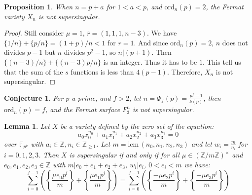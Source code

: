 \documentclass{article}
\newcommand{\Z}{\mathbb{Z}}
\newcommand{\finfield}[1]{\mathbb{F}_{#1}}
\newcommand{\lcm}[0]{\mathrm{lcm} \,}
\newcommand{\ord}[0]{\mathrm{ord}}
\newtheorem{lemma}[theorem]{Lemma}
\newtheorem{proposition}[theorem]{Proposition}
\newtheorem{conjecture}[theorem]{Conjecture}
\theoremstyle{definition}
\theoremstyle{definition}
\theoremstyle{remark}
\begin{document}
\begin{proposition}
When $n = p+a$ for $1 < a < p$, and $\ord_n(p) = 2$, the Fermat variety $X_n$ is not supersingular.
\end{proposition}
\begin{proof}
Still consider $\mu = 1$, $\overline{r} = (1,1,1,n-3)$. We have $\{1/n\} + \{p/n\} = (1+p)/n < 1$ for $r = 1$.
And since $\ord_n(p) = 2$, $n$ does not divides $p-1$ but $n$ divides $p^2 - 1$, so $n|(p+1)$. Then $\{(n-3)/n\} + \{(n-3)p/n\}$ is an integer. Thus it has to be $1$. This tell us that the sum of the $s$ functions is less than $4(p-1)$. Therefore, $X_n$ is not supersingular.
\end{proof}
\begin{conjecture}
For $p$ a prime, and $f > 2$, let $n = \Phi_f(p) = \frac{p^f - 1}{k(p)}$, then $\ord_n(p) = f$, and the Fermat surface $F^n_3$ is not supersingular.
\end{conjecture}

\begin{lemma} \label{variety_supersingular_E_constant}
Let $X$ be a variety defined by the zero set of the equation:
\[a_0 x_0^{n_0} + a_1 x_1^{n_1} + a_2 x_2^{n_2} + a_3 x_3^{n_3} = 0\]
over $\finfield{p^k}$ with $a_i \in \Z, n_i \in \Z_{\ge 1}$. Let $m = \lcm(n_0, n_1, n_2, n_3)$ and let $w_i = \frac{m}{n_i}$ for $i = 0,1,2,3$. Then $X$ is supersingular if and only if for all $\mu \in (\Z / m \Z)^\times$ and $e_0, e_1, e_2, e_3 \in \Z$ with $m | e_0 + e_1 + e_2 + e_3$, $w_i | e_i$, $0 < e_i < m$ we have:
\begin{equation*}
\sum_{i = 0}^{f-1} \left( \left\{\frac{\mu e_0p^i}{m}\right\} + \left\{\frac{\mu e_1p^i}{m}\right\} \right) 
= \sum_{i = 0}^{f-1} \left( \left\{\frac{-\mu e_2p^i}{m}\right\} + \left\{\frac{-\mu e_3p^i}{m}\right\} \right)
\end{equation*}
\end{lemma}
\end{document}
